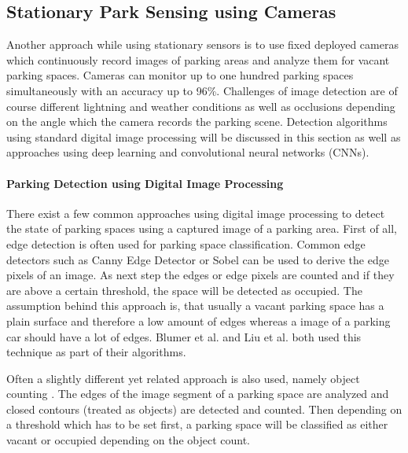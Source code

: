 




\subsection{Stationary Park Sensing using Cameras}
\label{sec:stationary_park_sensing_cameras}

Another approach while using stationary sensors is to use fixed deployed cameras which continuously record images of parking areas and analyze them for vacant parking spaces. Cameras can monitor up to one hundred parking spaces simultaneously with an accuracy up to 96\%. Challenges of image detection are of course different lightning and weather conditions as well as occlusions depending on the angle which the camera records the parking scene. Detection algorithms using standard digital image processing will be discussed in this section as well as approaches using deep learning and convolutional neural networks (CNNs).

\paragraph{Parking Detection using Digital Image Processing}

There exist a few common approaches using digital image processing to detect the state of parking spaces using a captured image of a parking area. First of all, edge detection is often used for parking space classification. Common edge detectors such as Canny Edge Detector or Sobel can be used to derive the edge pixels of an image. As next step the edges or edge pixels are counted and if they are above a certain threshold, the space will be detected as occupied. The assumption behind this approach is, that usually a vacant parking space has a plain surface and therefore a low amount of edges whereas a image of a parking car should have a lot of edges. Blumer et al. \cite{Blumer2012} and Liu et al. \cite{stationary_camera_sensing} both used this technique as part of their algorithms. 

Often a slightly different yet related approach is also used, namely object counting \cite{stationary_camera_sensing}. The edges of the image segment of a parking space are analyzed and closed contours (treated as objects) are detected and counted. Then depending on a threshold which has to be set first, a parking space will be classified as either vacant or occupied depending on the object count.

